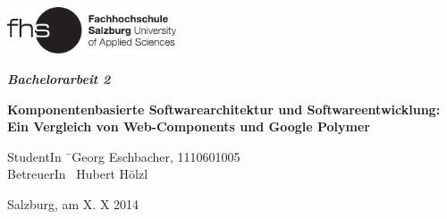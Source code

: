 \begin{titlepage}
\begin{center}

\includegraphics[width=5cm]{images/FHSLogo.pdf}

\vspace*{4cm}

\Large{
  \textit{\textbf{Bachelorarbeit 2}}
}

\vspace*{4cm}

\large{
  \textbf{Komponentenbasierte Softwarearchitektur und Softwareentwicklung: Ein Vergleich von Web-Components und Google Polymer}\\
}

\end{center}

\vfill

\begin{tabbing}
StudentIn \= \ Georg Eschbacher, 1110601005 \\
BetreuerIn \> \ Hubert Hölzl

\end{tabbing}

Salzburg, am X. X 2014
\end{titlepage}
